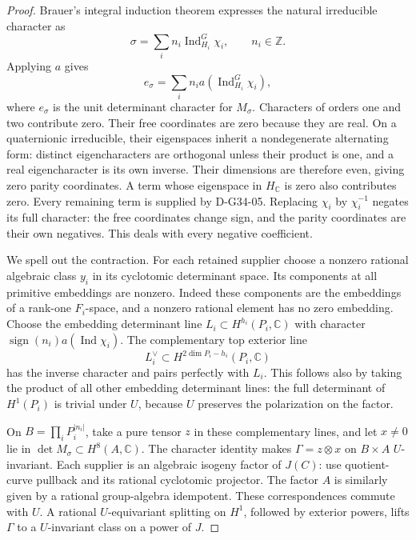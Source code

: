 \begin{proof}
Brauer's integral induction theorem
\cite[\S10.5, Theorems 19--20]{G34:Serre} expresses the natural irreducible
character as
\[
                          \sigma=\sum_i n_i
                                  \operatorname{Ind}_{H_i}^G\chi_i,
                             \qquad n_i\in\mathbb Z.
\]
Applying \(a\) gives
\[
                           e_\sigma=\sum_i n_i
                             a(\operatorname{Ind}_{H_i}^G\chi_i),
\]
where \(e_\sigma\) is the unit determinant character for \(M_\sigma\).
Characters of orders one and two contribute zero.  Their free coordinates
are zero because they are real.  On a quaternionic irreducible, their
eigenspaces inherit a nondegenerate alternating form: distinct eigencharacters
are orthogonal unless their product is one, and a real eigencharacter is
its own inverse.  Their dimensions are therefore even, giving zero parity
coordinates.  A term whose eigenspace in \(H_{\mathbb C}\) is zero also
contributes zero.  Every remaining term is supplied by D-G34-05.
Replacing \(\chi_i\) by \(\chi_i^{-1}\) negates its full character:
the free coordinates change sign, and the parity coordinates are their own
negatives.  This deals with every negative coefficient.

We spell out the contraction.  For each retained supplier choose a nonzero
rational algebraic class \(y_i\) in its cyclotomic determinant space.
Its components at all primitive embeddings are nonzero.  Indeed these
components are the embeddings of a rank-one \(F_i\)-space, and a nonzero
rational element has no zero embedding.  Choose the embedding determinant
line \(L_i\subset H^{h_i}(P_i,\mathbb C)\) with character
\(\operatorname{sign}(n_i)a(\operatorname{Ind}\chi_i)\).
The complementary top exterior line
\[
                     L_i^\vee\subset
                       H^{2\dim P_i-h_i}(P_i,\mathbb C)
\]
has the inverse character and pairs perfectly with \(L_i\).  This follows
also by taking the product of all other embedding determinant lines: the
full determinant of \(H^1(P_i)\) is trivial under \(U\), because \(U\)
preserves the polarization on the factor.

On \(B=\prod_iP_i^{|n_i|}\), take a pure tensor \(z\) in these complementary
lines, and let \(x\ne0\) lie in \(\det M_\sigma\subset H^8(A,\mathbb C)\).
The character identity makes \(\Gamma=z\otimes x\) on \(B\times A\)
\(U\)-invariant.  Each supplier is an algebraic isogeny factor of \(J(C)\):
use quotient-curve pullback and its rational cyclotomic projector.
The factor \(A\) is similarly given by a rational group-algebra idempotent.
These correspondences commute with \(U\).  A rational \(U\)-equivariant
splitting on \(H^1\), followed by exterior powers, lifts \(\Gamma\) to a
\(U\)-invariant class on a power of \(J\).


\end{proof}
